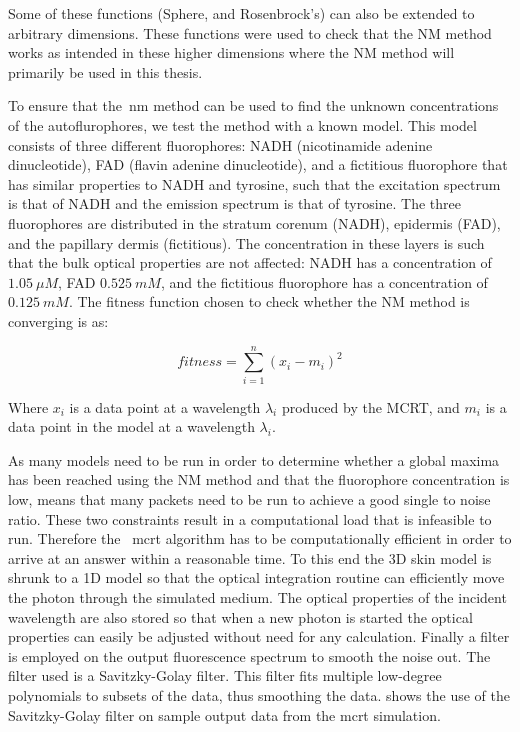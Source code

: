 Some of these functions (Sphere, and Rosenbrock's) can also be extended to arbitrary dimensions. These functions were used to check that the NM method works as intended in these higher dimensions where the NM method will primarily be used in this thesis.

To ensure that the~\gls*{nm} method can be used to find the unknown concentrations of the autoflurophores, we test the method with a known model.
This model consists of three different fluorophores: NADH (nicotinamide adenine dinucleotide), FAD (flavin adenine dinucleotide), and a fictitious fluorophore that has similar properties to NADH and tyrosine, such that the excitation spectrum is that of NADH and the emission spectrum is that of tyrosine.
The three fluorophores are distributed in the stratum corenum (NADH), epidermis (FAD), and the papillary dermis (fictitious).
The concentration in these layers is such that the bulk optical properties are not affected: NADH has a concentration of $1.05~\mu M$, FAD $0.525~m M$, and the fictitious fluorophore has a concentration of $0.125~mM$. %
The fitness function chosen to check whether the NM method is converging is as:

\begin{equation}
fitness = \sum\limits_{i=1}^{n}(x_i-m_i)^2
\end{equation}

Where $x_i$ is a data point at a wavelength $\lambda_i$ produced by the MCRT, and $m_i$ is a data point in the model at a wavelength $\lambda_i$.

As many models need to be run in order to determine whether a global maxima has been reached using the NM method and that the fluorophore concentration is low, means that many packets need to be run to achieve a good single to noise ratio.
These two constraints result in a computational load that is infeasible to run. 
Therefore the ~\gls*{mcrt} algorithm has to be computationally efficient in order to arrive at an answer within a reasonable time.
To this end the 3D skin model is shrunk to a 1D model so that the optical integration routine can efficiently move the photon through the simulated medium.
The optical properties of the incident wavelength are also stored so that when a new photon is started the optical properties can easily be adjusted without need for any calculation.
Finally a filter is employed on the output fluorescence spectrum to smooth the noise out.
The filter used is a Savitzky-Golay filter.
This filter fits multiple low-degree polynomials to subsets of the data, thus smoothing the data. 
 shows the use of the Savitzky-Golay filter on sample output data from the \gls*{mcrt} simulation.

